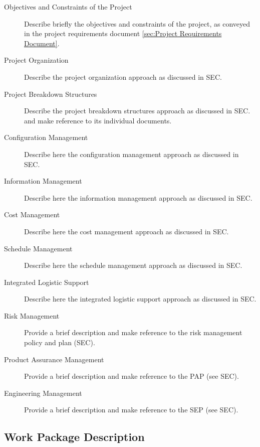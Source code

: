 \begin{description}
\item[Objectives and Constraints of the Project]
Describe briefly the objectives and constraints of the project, as conveyed in the project requirements document \ref{sec:Project Requirements Document}.
\item[Project Organization]
Describe the project organization approach as discussed in SEC.
\item[Project Breakdown Structures]
Describe the project breakdown structures approach as discussed in SEC. and make reference to its individual documents.
\item[Configuration Management]
Describe here the configuration management approach as discussed in SEC.
\item[Information Management]
Describe here the information management approach as discussed in SEC.
\item[Cost Management]
Describe here the cost management approach as discussed in SEC.
\item[Schedule Management]
Describe here the schedule management approach as discussed in SEC.
\item[Integrated Logistic Support]
Describe here the integrated logistic support approach as discussed in SEC.
\item[Risk Management]
Provide a brief description and make reference to the risk management policy and plan (SEC).
\item[Product Assurance Management]
Provide a brief description and make reference to the PAP (see SEC).
\item[Engineering Management]
Provide a brief description and make reference to the SEP (see SEC).
\end{description}


\subsection{Work Package Description}
\label{sec:Work Package Description}

\begin{comment}
The work package description shall contain all the elements shown in this template.
1. project name and project phase;
2. WP title;
3. unique identification of each WP and issue number
4. supplier or entity in charge of the WP performance;
5. WP manager’s name and organization;
6. supplier’s country;
7. product to which the tasks of the WP are allocated (link to the
product tree);
8. description of the objectives of the WP;
9. description of the tasks;
10. list of the inputs necessary to achieve the tasks;
11. interfaces or links with other tasks or WP’s;
12. list of constraints, requirements, standards, and regulations;
13. list of the expected outputs;
14. list of deliverables;
15. location of delivery;
16. start event identification including date;
17. end event identification including date;
18. excluded tasks.

\clearpage
\end{comment}


